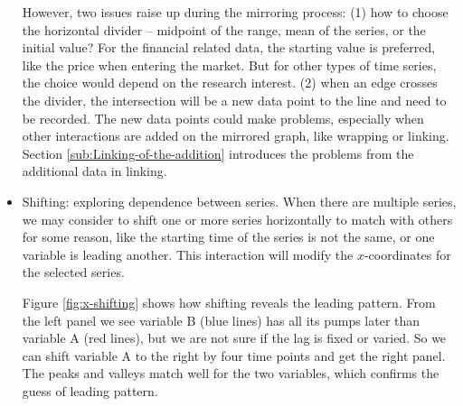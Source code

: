 \documentclass[12pt]{article}
\begin{document}
\begin{itemize}
However, two issues raise up during the mirroring process:  (1) how
to choose the horizontal divider -- midpoint of the range, mean of
the series, or the initial value? For the financial related data,
the starting value is preferred, like the price when entering the
market. But for other types of time series, the choice would depend
on the research interest.  (2) when an edge crosses the divider, the
intersection will be a new data point to the line and need to be recorded.
The new data points could make problems, especially when other interactions
are added on the mirrored graph, like wrapping or linking. Section
\ref{sub:Linking-of-the-addition} introduces the problems from the
additional data in linking.



\item Shifting: exploring dependence between series.
When there are multiple series, we may consider to shift one or more
series horizontally to match with others for some reason, like the
starting time of the series is not the same, or one variable is leading
another. This interaction will modify the $x$-coordinates for the selected
series.

Figure \ref{fig:x-shifting} shows how shifting reveals the leading
pattern. From the left panel we see variable B  (blue lines) has all
its pumps later than variable A  (red lines), but we are not sure if
the lag is fixed or varied. So we can shift variable A to the right
by four time points and get the right panel. The peaks and valleys
match well for the two variables, which confirms the guess of leading
pattern.


\end{itemize}
\end{document}
